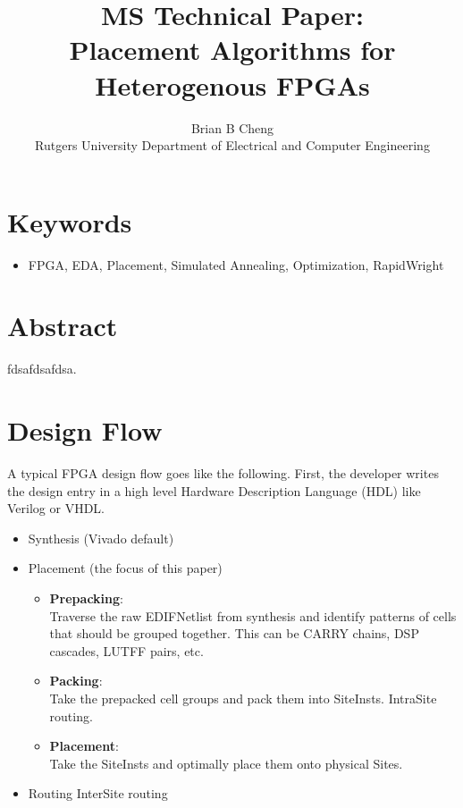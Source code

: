 \documentclass{article}
\begin{document}
\title{MS Technical Paper: \\ Placement Algorithms for Heterogenous FPGAs}
\author{Brian B Cheng \\ Rutgers University Department of Electrical and Computer Engineering}


\date{}
\maketitle

\section{Keywords}
\begin{itemize}
    \item FPGA, EDA, Placement, Simulated Annealing, Optimization, RapidWright
\end{itemize}


\begin{multicols}{2}
\section{Abstract}
    fdsafdsafdsa.

\section{Design Flow}
A typical FPGA design flow goes like the following. First, the developer writes the design entry in a high level Hardware Description Language (HDL) like Verilog or VHDL.
\begin{itemize}
\item Synthesis (Vivado default)
\item Placement (the focus of this paper)
    \begin{itemize}
        \item \textbf{Prepacking}:\\
        Traverse the raw EDIFNetlist from synthesis and identify patterns of cells that should be grouped together.
        This can be CARRY chains, DSP cascades, LUTFF pairs, etc.
    \item \textbf{Packing}:\\
        Take the prepacked cell groups and pack them into SiteInsts.
        Intra\-Site routing.
    \item \textbf{Placement}:\\
        Take the SiteInsts and optimally place them onto physical Sites.
    \end{itemize}
\item Routing
    Inter\-Site routing
\end{itemize}

\end{multicols}
\end{document}
